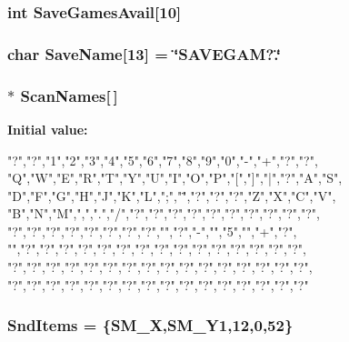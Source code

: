 \label{WL__MENU_8C_a676a8d7bb5b64f29ab3ea8fe6a4f3242}
\hypertarget{WL__MENU_8C_a7b06c11298b6b799f082f8188c0dbd2c}{
\subsubsection[{SaveGamesAvail}]{\setlength{\rightskip}{0pt plus 5cm}int {\bf SaveGamesAvail}\mbox{[}10\mbox{]}}}
\label{WL__MENU_8C_a7b06c11298b6b799f082f8188c0dbd2c}
\hypertarget{WL__MENU_8C_a8501cb4aab0ffc4fca7a7a979ae7728d}{
\subsubsection[{SaveName}]{\setlength{\rightskip}{0pt plus 5cm}char {\bf SaveName}\mbox{[}13\mbox{]} = \char`\"{}SAVEGAM?.\char`\"{}}}
\label{WL__MENU_8C_a8501cb4aab0ffc4fca7a7a979ae7728d}
\hypertarget{WL__MENU_8C_ac518bdab6a3394470ca5df383625f614}{
\subsubsection[{ScanNames}]{$\ast$ {\bf ScanNames}\mbox{[}$\,$\mbox{]}}}
\label{WL__MENU_8C_ac518bdab6a3394470ca5df383625f614}
{\bfseries Initial value:}
\begin{DoxyCode}
                
                                        {
        "?","?","1","2","3","4","5","6","7","8","9","0","-","+","?","?",
        "Q","W","E","R","T","Y","U","I","O","P","[","]","|","?","A","S",
        "D","F","G","H","J","K","L",";","\"","?","?","?","Z","X","C","V",
        "B","N","M",",",".","/","?","?","?","?","?","?","?","?","?","?",
        "?","?","?","?","?","?","?","?","\xf","?","-","","5","","+","?",
        "","?","?","?","?","?","?","?","?","?","?","?","?","?","?","?",
        "?","?","?","?","?","?","?","?","?","?","?","?","?","?","?","?",
        "?","?","?","?","?","?","?","?","?","?","?","?","?","?","?","?"
                                        }
\end{DoxyCode}
\hypertarget{WL__MENU_8C_a8810a70d8c0aacc1ea82e104825ef35e}{
\subsubsection[{SndItems}]{ {\bf SndItems} = \{SM\_\-X,SM\_\-Y1,12,0,52\}}}
